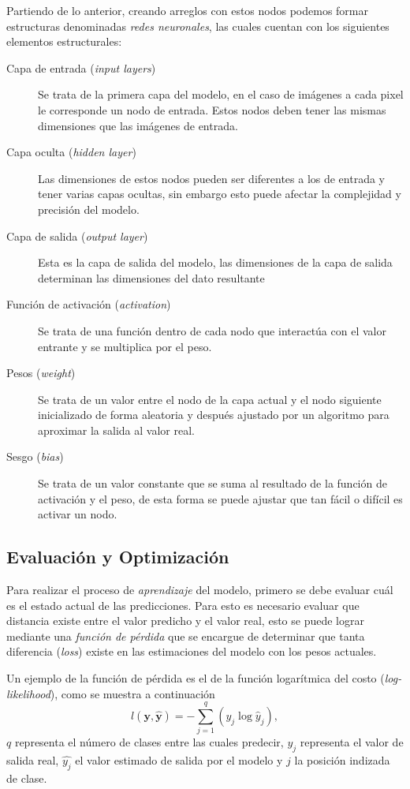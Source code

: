 Partiendo de lo anterior, creando arreglos con estos nodos podemos formar estructuras denominadas \emph{redes neuronales}, las cuales cuentan con los siguientes elementos estructurales:

\begin{description}
    \item[Capa de entrada (\emph{input layers})] { Se trata de la primera capa del modelo, en el caso de imágenes a cada pixel le corresponde un nodo de entrada. Estos nodos deben tener las mismas dimensiones que las imágenes de entrada.}
    \item[Capa oculta (\emph{hidden layer})] {Las dimensiones de estos nodos pueden ser diferentes a los de entrada y tener varias capas ocultas, sin embargo esto puede afectar la complejidad y precisión del modelo.} 
    \item[Capa de salida (\emph{output layer})]  {Esta es la capa de salida del modelo, las dimensiones de la capa de salida determinan las dimensiones del dato resultante}
    \item[Función de activación (\emph{activation})]{Se trata de una función dentro de cada nodo que interactúa con el valor entrante y se multiplica por el peso.}
    \item[Pesos (\emph{weight})] {Se trata de un valor entre el nodo de la capa actual y el nodo siguiente inicializado de forma aleatoria y después ajustado por un algoritmo para aproximar la salida al valor real.}  
    \item[Sesgo (\emph{bias})] {Se trata de un valor constante que se suma al resultado de la función de activación y el peso, de esta forma se puede ajustar que tan fácil o difícil es activar un nodo.} 
\end{description}

\subsection{Evaluación y Optimización}
Para realizar el proceso de \emph{aprendizaje} del modelo, primero se debe evaluar cuál es el estado actual de las predicciones. Para esto es necesario evaluar que distancia existe entre el valor predicho y el valor real, esto se puede lograr mediante una \emph{función de pérdida} que se encargue de determinar que tanta diferencia (\emph{loss}) existe en las estimaciones del modelo con los pesos actuales.

Un ejemplo de la función de pérdida es el de la función logarítmica del costo (\emph{log-likelihood}), como se muestra a continuación
\begin{equation}
    l(\mathbf{y}, \hat{\mathbf{y}}) = - \sum_{j=1}^q (y_j \log \hat{y}_j),     
\end{equation}
$q$ representa el número de clases entre las cuales predecir, $y_j$ representa el valor de salida real, $\hat{y_j}$ el valor estimado de salida por el modelo y $j$ la posición indizada de clase.

